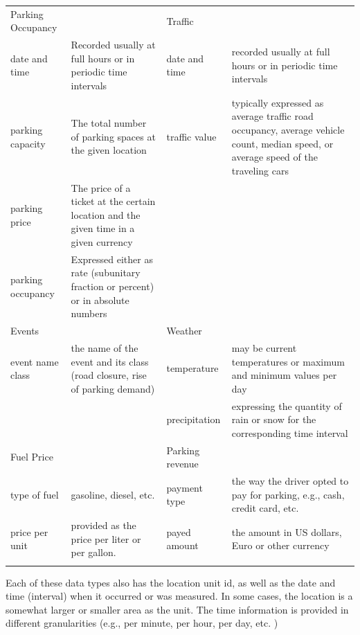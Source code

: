 \documentclass{ws-ijait}
\begin{document}
	\begin{table}
		{\begin{tabular}{lp{4cm}lp{4cm}}	
				\toprule
				Parking Occupancy & & Traffic & \\
				\colrule
				date and time & Recorded usually at full hours or in periodic time intervals & date and time & recorded usually at full hours or in periodic time intervals \\
				parking capacity & The total number of parking spaces at the given location & traffic value & typically expressed as average traffic road occupancy, average vehicle count, median speed, or average speed of the traveling cars \\
				parking price & The price of a ticket at the certain location and the given time in a given currency & & \\
				parking occupancy & Expressed either as rate (subunitary fraction or percent) or in absolute numbers & & \\
				\colrule
				Events & & Weather & \\
				\colrule
				event name class & the name of the event and its class (road closure, rise of parking demand) & temperature & may be current temperatures or maximum and minimum values per day \\
				& & 	precipitation & expressing the quantity of rain or snow for the corresponding time interval \\
				\colrule
				Fuel Price & & Parking revenue & \\
				\colrule
				type of fuel & gasoline, diesel, etc. & payment type & the way the driver opted to pay for parking, e.g., cash, credit card, etc. \\
				
				price per unit & provided as the price per liter or per gallon. & payed amount & the amount in US dollars, Euro or other currency\\
				
				\botrule
		\end{tabular}}
		\begin{tabnote}
			Each of these data types also has the location unit id, as well as the date and time (interval) when it occurred or was measured. 
			In some cases, the location is a somewhat larger or smaller area as the unit. The time information is provided in different granularities (e.g., per minute, per hour, per day, etc. )
		\end{tabnote}
		\label{tab:sfpark_data}
	\end{table}
	
\end{document}
